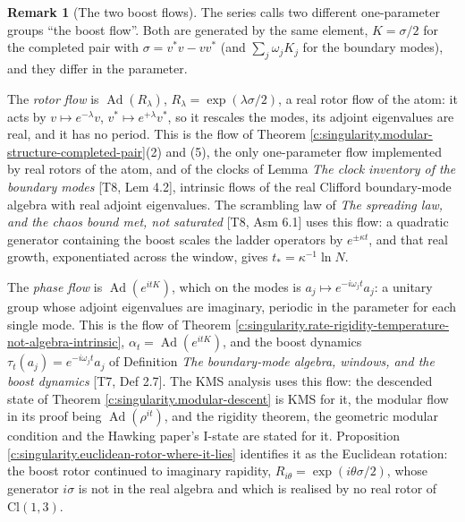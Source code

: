 \documentclass[11pt]{article}
\theoremstyle{definition}
\newtheorem{remark}[theorem]{Remark}
\theoremstyle{plain}
\newcommand{\changedmark}[2]{\marginpar{\raggedright\scriptsize\color{#1}#2}}
\providecommand{\Cl}{}\renewcommand{\Cl}{\mathrm{Cl}}
\begin{document}
\begin{remark}[The two boost flows]\label{c:note.decisions.two-boost-flows}
\changedmark{MidnightBlue}{added since the deposit}
The series calls two different one-parameter groups ``the boost flow''. Both are generated by the same element, $K = \sigma/2$ for the completed pair with $\sigma = v^{*}v - vv^{*}$ (and $\sum_j \omega_j K_j$ for the boundary modes), and they differ in the parameter.

The \emph{rotor flow} is $\operatorname{Ad}(R_\lambda)$, $R_\lambda = \exp(\lambda\sigma/2)$, a real rotor flow of the atom: it acts by $v \mapsto e^{-\lambda}v$, $v^{*} \mapsto e^{+\lambda}v^{*}$, so it rescales the modes, its adjoint eigenvalues are real, and it has no period. This is the flow of Theorem \ref{c:singularity.modular-structure-completed-pair}(2) and (5), the only one-parameter flow implemented by real rotors of the atom, and of the clocks of Lemma \emph{The clock inventory of the boundary modes} [T8, Lem 4.2], intrinsic flows of the real Clifford boundary-mode algebra with real adjoint eigenvalues. The scrambling law of \emph{The spreading law, and the chaos bound met, not saturated} [T8, Asm 6.1] uses this flow: a quadratic generator containing the boost scales the ladder operators by $e^{\pm\kappa t}$, and that real growth, exponentiated across the window, gives $t_{*} = \kappa^{-1}\ln N$.

The \emph{phase flow} is $\operatorname{Ad}(e^{itK})$, which on the modes is $a_j \mapsto e^{-i\omega_j t}a_j$: a unitary group whose adjoint eigenvalues are imaginary, periodic in the parameter for each single mode. This is the flow of Theorem \ref{c:singularity.rate-rigidity-temperature-not-algebra-intrinsic}, $\alpha_t = \operatorname{Ad}(e^{itK})$, and the boost dynamics $\tau_t(a_j) = e^{-i\omega_j t}a_j$ of Definition \emph{The boundary-mode algebra, windows, and the boost dynamics} [T7, Def 2.7]. The KMS analysis uses this flow: the descended state of Theorem \ref{c:singularity.modular-descent} is KMS for it, the modular flow in its proof being $\operatorname{Ad}(\rho^{it})$, and the rigidity theorem, the geometric modular condition and the Hawking paper's I-state are stated for it. Proposition \ref{c:singularity.euclidean-rotor-where-it-lies} identifies it as the Euclidean rotation: the boost rotor continued to imaginary rapidity, $R_{i\theta} = \exp(i\theta\sigma/2)$, whose generator $i\sigma$ is not in the real algebra and which is realised by no real rotor of $\Cl(1,3)$.


\end{remark}
\end{document}
